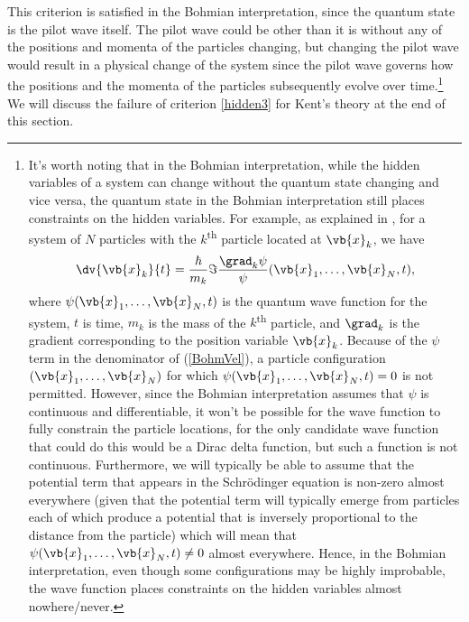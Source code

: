 \documentclass[12pt]{report}
\begin{document}
This criterion is satisfied in the Bohmian interpretation, since the quantum state is the pilot wave itself. The pilot wave could be other than it is without any of the positions and momenta of the particles changing, but changing the pilot wave would result in a physical change of the system since the pilot wave governs how  the positions and the momenta of the particles subsequently evolve over time.\footnote{It's worth noting that in the Bohmian interpretation, while the hidden variables of a system can change without the quantum state changing and vice versa, the quantum state in the Bohmian interpretation still places constraints on the hidden variables. For example, as explained in \cite[31]{DurrDetlef2013Qpwq}, for a system of $N$ particles with the $k$\textsuperscript{th} particle located at $\vb{x}_k$, we have
\begin{equation}\label{BohmVel}\dv{\vb{x}_k}{t} = \frac{\hbar}{m_k} \Im \frac{\grad_k\psi}{\psi}(\vb{x}_1,\ldots,\vb{x}_N, t),
\end{equation}
where $\psi(\vb{x}_1,\ldots,\vb{x}_N, t)$ is the quantum wave function for the system, $t$ is time, $m_k$ is the mass of the $k$\textsuperscript{th} particle, and $\grad_k$ is the gradient corresponding to the position variable $\vb{x}_k$. Because of the $\psi$ term in the denominator
 of (\ref{BohmVel}), a particle configuration $(\vb{x}_1,\ldots,\vb{x}_N)$ for which $\psi(\vb{x}_1,\ldots,\vb{x}_N, t)=0$ is not permitted. However, since the Bohmian interpretation assumes that $\psi$ is continuous and differentiable, it won't be possible for the wave function to fully constrain the particle locations, for the only  candidate wave function that could do this would be a Dirac delta function, but such a function is not continuous. Furthermore, we will typically be able to assume that the potential term that appears in the Schr\"{o}dinger equation is non-zero almost everywhere (given that the potential term will typically emerge from particles each of which produce a potential that is inversely proportional to the distance from the particle) which will mean that $\psi(\vb{x}_1,\ldots,\vb{x}_N, t) \neq 0$ almost everywhere. Hence, in the Bohmian interpretation, even though some configurations may be highly improbable, the wave function places constraints on the hidden variables almost nowhere/never.\label{BohmianConstraints}
}
 We will discuss the failure of criterion \ref{hidden3} for Kent's theory at the end of this section.
\end{document}
